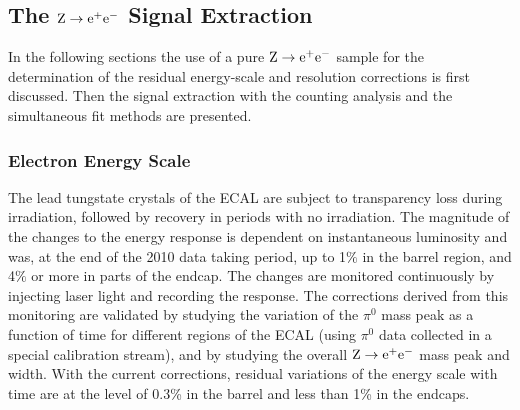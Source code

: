 \subsection{\texorpdfstring{The $\mathrm{Z} \rightarrow \mathrm{e}^+\mathrm{e}^-$ Signal Extraction}{The Z->ee Signal Extraction}}

In the following sections the use of a pure $\mathrm{Z} \rightarrow \mathrm{e}^+\mathrm{e}^-$ sample
for the determination of the residual energy-scale and resolution corrections is first discussed.
Then the signal extraction with the counting analysis and the
simultaneous fit methods are presented.

\subsubsection{Electron Energy Scale}
\label{sec:e-escale}

The lead tungstate crystals of the ECAL are subject to transparency loss
during irradiation, followed by recovery in periods with no
irradiation. The magnitude of the changes to the energy response is
dependent on instantaneous luminosity and was, at the end of the 2010
data taking period, up to 1$\%$ in the barrel region, and 4$\%$ or more in
parts of the endcap. The changes are monitored continuously by injecting
laser light and recording the response. The corrections derived from
this monitoring are validated by studying the variation of the $\pi^0$ mass
peak as a function of time for different regions of the ECAL (using $\pi^0$ data
collected in a special calibration stream), and by studying the overall $\mathrm{Z} \rightarrow \mathrm{e}^+\mathrm{e}^-$ mass peak and width.
%
%
With the current corrections, residual variations of the energy scale with time are
at the level of 0.3\% in the barrel and less than 1\% in the endcaps.


